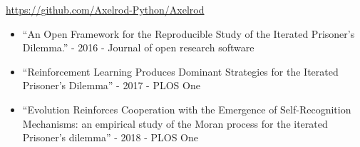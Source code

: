 \documentclass{beamer}
\begin{document}
    \begin{frame}
        \begin{center}
            \Large
            \url{https://github.com/Axelrod-Python/Axelrod}
        \end{center}

        \pause

        \begin{itemize}
            \item  ``An Open Framework for the Reproducible Study of the Iterated
                Prisoner’s Dilemma.'' - 2016 - Journal of open research software
            \item  ``Reinforcement Learning Produces Dominant Strategies for
                the Iterated Prisoner's Dilemma'' - 2017 - PLOS One
            \item  ``Evolution Reinforces Cooperation with the Emergence of
                Self-Recognition Mechanisms: an empirical study of the Moran
                process for the iterated Prisoner's dilemma'' - 2018 - PLOS One
        \end{itemize}
    \end{frame}







\end{document}
